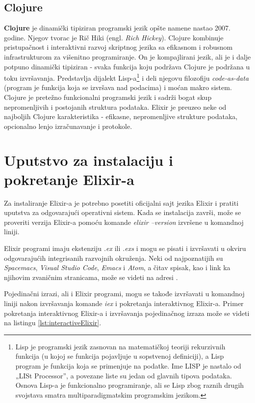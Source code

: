 \documentclass[12pt,oneside]{memoir}
\begin{document}
\subsection{Clojure}
\textbf{Clojure} je dinamički tipiziran programski jezik opšte namene nastao 2007. godine. Njegov tvorac je Rič Hiki (engl. \textit{Rich Hickey}). Clojure kombinuje pristupačnost i interaktivni razvoj skriptnog jezika sa efikasnom i robusnom infrastrukturom za višenitno programiranje. On je kompajlirani jezik, ali je i dalje potpuno dinamički tipiziran - svaka funkcija koju podržava Clojure je podržana u toku izvršavanja. Predstavlja dijalekt Lisp-a\footnote{Lisp je programski jezik  zasnovan na matematičkoj teoriji rekurzivnih funkcija
(u kojoj se funkcija pojavljuje u sopstvenoj definiciji), a Lisp program je funkcija
koja se primenjuje na podatke. Ime
LISP je nastalo od „LISt Processor”, a povezane liste su jedan od glavnih tipova
podataka. Osnova Lisp-a je funkcionalno programiranje, ali se Lisp zbog raznih drugih svojstava smatra multiparadigmatskim programskim jezikom.} i deli njegovu filozofiju \textit{code-as-data} (program je funkcija koja se izvršava nad podacima) i moćan makro sistem. Clojure je pretežno funkcionalni programski jezik i sadrži bogat skup nepromenljivih i postojanih struktura podataka. Elixir je preuzeo neke od najboljih Clojure karakteristika - efikasne, nepromenljive strukture podataka, opcionalno lenjo izračunavanje i protokole.


\section{Uputstvo za instalaciju i pokretanje Elixir-a}
\label{odeljak:Instalacija}

Za instaliranje Elixir-a je potrebno posetiti oficijalni sajt jezika Elixir \cite{Elixir} i pratiti uputstva za odgovarajući operativni sistem. Kada se instalacija završi, može se proveriti verzija Elixir-a pomoću komande \textit{elixir --version} izvršene u komandnoj liniji.

Elixir programi imaju ekstenziju \textit{.ex} ili \textit{.exs} i mogu se pisati i izvršavati u okviru odgovarajućih integrisanih razvojnih okruženja. Neki od najpoznatijih su \textit{Spacemacs}, \textit{Visual Studio Code}, \textit{Emacs} i \textit{Atom}, a čitav spisak, kao i link ka njihovim zvaničnim stranicama, može se videti na adresi \cite{ElixirEditors}.

Pojedinačni izrazi, ali i Elixir programi, mogu se takođe izvršavati u komandnoj liniji nakon izvršavanja komande \textit{iex} i pokretanja interaktivnog Elixir-a. Primer pokretanja interaktivnog Elixir-a i izvršavanja pojedinačnog izraza može se videti na listingu \ref{lst:interactiveElixir}.
\end{document}
